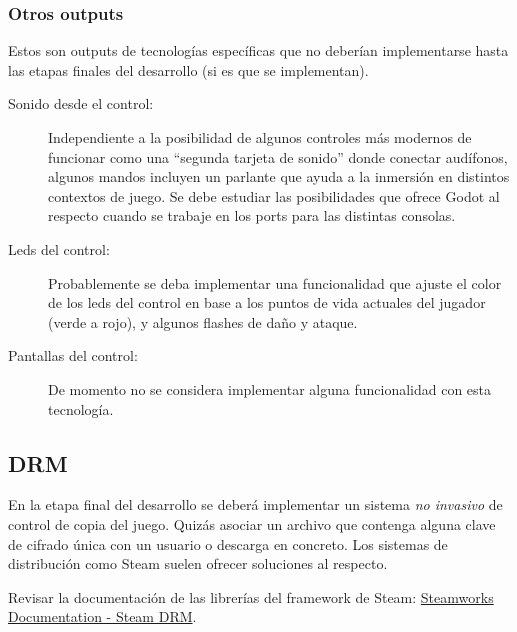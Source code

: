 \subsubsection{Otros outputs}
Estos son outputs de tecnologías específicas que no deberían implementarse hasta las etapas finales del desarrollo (si es que se implementan).

\begin{description}
\item[Sonido desde el control:] Independiente a la posibilidad de algunos controles más modernos de funcionar como una “segunda tarjeta de sonido” donde conectar audífonos, algunos mandos incluyen un parlante que ayuda a la inmersión en distintos contextos de juego. Se debe estudiar las posibilidades que ofrece Godot al respecto cuando se trabaje en los ports para las distintas consolas.

\item[Leds del control:] Probablemente se deba implementar una funcionalidad que ajuste el color de los leds del control en base a los puntos de vida actuales del jugador (verde a rojo), y algunos flashes de daño y ataque.

\item[Pantallas del control:] De momento no se considera implementar alguna funcionalidad con esta tecnología.
\end{description}

\subsection{DRM}
En la etapa final del desarrollo se deberá implementar un sistema \emph{no invasivo} de control de copia del juego. Quizás asociar un archivo que contenga alguna clave de cifrado única con un usuario o descarga en concreto. Los sistemas de distribución como Steam suelen ofrecer soluciones al respecto.

Revisar la documentación de las librerías del framework de Steam: \href{https://partner.steamgames.com/doc/features/drm}{Steamworks Documentation - Steam DRM}.